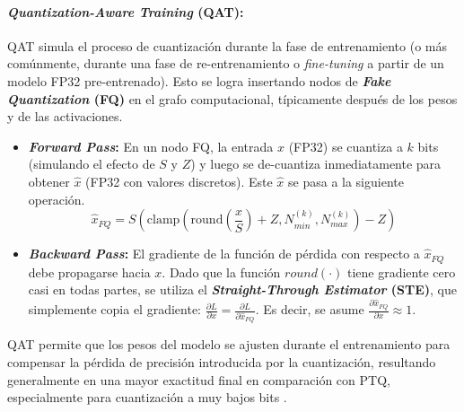 \documentclass[12pt]{article}
\begin{document}
\paragraph{\textit{Quantization-Aware Training} (QAT):}
QAT simula el proceso de cuantización durante la fase de entrenamiento (o más comúnmente, durante una fase de re-entrenamiento o \textit{fine-tuning} a partir de un modelo FP32 pre-entrenado). Esto se logra insertando nodos de \textbf{\textit{Fake Quantization} (FQ)} en el grafo computacional, típicamente después de los pesos y de las activaciones.

\begin{itemize}
    \item \textbf{\textit{Forward Pass}:} En un nodo FQ, la entrada $x$ (FP32) se cuantiza a $k$ bits (simulando el efecto de $S$ y $Z$) y luego se de-cuantiza inmediatamente para obtener $\hat{x}$ (FP32 con valores discretos). Este $\hat{x}$ se pasa a la siguiente operación.
    \begin{equation}
    \hat{x}_{FQ} = S \left( \text{clamp} \left( \text{round}\left(\frac{x}{S}\right) + Z, N_{min}^{(k)}, N_{max}^{(k)} \right) - Z \right)
    \label{eq:fake_quantization}
    \end{equation}
    \item \textbf{\textit{Backward Pass}:} El gradiente de la función de pérdida con respecto a $\hat{x}_{FQ}$ debe propagarse hacia $x$. Dado que la función $round(\cdot)$ tiene gradiente cero casi en todas partes, se utiliza el \textbf{\textit{Straight-Through Estimator} (STE)}, que simplemente copia el gradiente: $\frac{\partial L}{\partial x} = \frac{\partial L}{\partial \hat{x}_{FQ}}$. Es decir, se asume $\frac{\partial \hat{x}_{FQ}}{\partial x} \approx 1$.
\end{itemize}
QAT permite que los pesos del modelo se ajusten durante el entrenamiento para compensar la pérdida de precisión introducida por la cuantización, resultando generalmente en una mayor exactitud final en comparación con PTQ, especialmente para cuantización a muy bajos bits \cite{Liang2021PruningSurvey, Rezk2022MOHAQ}.
\end{document}
